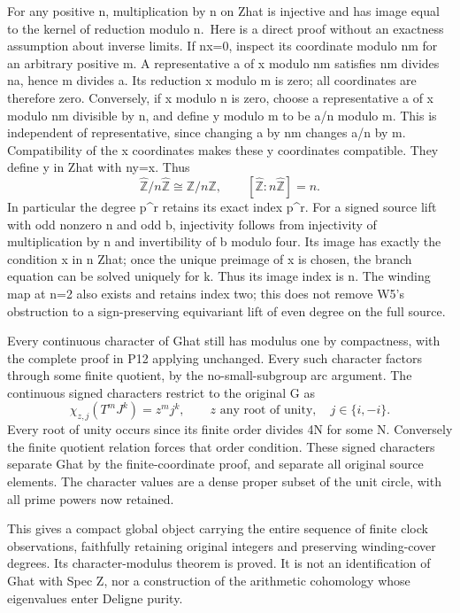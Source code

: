 \documentclass[
  11pt,
]{article}
\begin{document}
For any positive n, multiplication by n on Zhat is injective and has
image equal to the kernel of reduction modulo n.~Here is a direct proof
without an exactness assumption about inverse limits. If nx=0, inspect
its coordinate modulo nm for an arbitrary positive m. A representative a
of x modulo nm satisfies nm divides na, hence m divides a. Its reduction
x modulo m is zero; all coordinates are therefore zero. Conversely, if x
modulo n is zero, choose a representative a of x modulo nm divisible by
n, and define y modulo m to be a/n modulo m. This is independent of
representative, since changing a by nm changes a/n by m. Compatibility
of the x coordinates makes these y coordinates compatible. They define y
in Zhat with ny=x. Thus \[
\widehat{\mathbb Z}/n\widehat{\mathbb Z}\cong\mathbb Z/n\mathbb Z,
\qquad [\widehat{\mathbb Z}:n\widehat{\mathbb Z}]=n.
\] In particular the degree p\^{}r retains its exact index p\^{}r. For a
signed source lift with odd nonzero n and odd b, injectivity follows
from injectivity of multiplication by n and invertibility of b modulo
four. Its image has exactly the condition x in n Zhat; once the unique
preimage of x is chosen, the branch equation can be solved uniquely for
k. Thus its image index is \textbar n\textbar. The winding map at n=2
also exists and retains index two; this does not remove W5's obstruction
to a sign-preserving equivariant lift of even degree on the full source.

Every continuous character of Ghat still has modulus one by compactness,
with the complete proof in P12 applying unchanged. Every such character
factors through some finite quotient, by the no-small-subgroup arc
argument. The continuous signed characters restrict to the original G as
\[
\chi_{z,j}(T^mJ^k)=z^m j^k,
\qquad z\text{ any root of unity},\quad j\in\{i,-i\}.
\] Every root of unity occurs since its finite order divides 4N for some
N. Conversely the finite quotient relation forces that order condition.
These signed characters separate Ghat by the finite-coordinate proof,
and separate all original source elements. The character values are a
dense proper subset of the unit circle, with all prime powers now
retained.

This gives a compact global object carrying the entire sequence of
finite clock observations, faithfully retaining original integers and
preserving winding-cover degrees. Its character-modulus theorem is
proved. It is not an identification of Ghat with Spec Z, nor a
construction of the arithmetic cohomology whose eigenvalues enter
Deligne purity.
\end{document}
